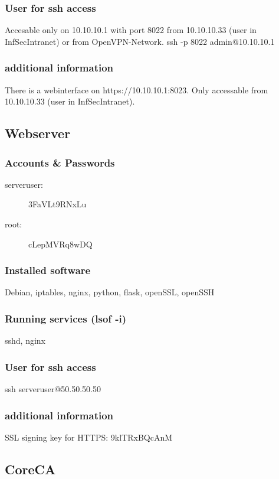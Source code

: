 \documentclass[a4paper,11pt]{article}
\begin{document}
\subsubsection*{User for ssh access}
Accesable only on 10.10.10.1 with port 8022 from 10.10.10.33 (user in InfSecIntranet) or from OpenVPN-Network.\newline
ssh -p 8022 admin@10.10.10.1
\subsubsection*{additional information}
There is a webinterface on https://10.10.10.1:8023. Only accessable from 10.10.10.33 (user in InfSecIntranet).

\subsection{Webserver}
\subsubsection*{Accounts \& Passwords}
\begin{multicols}{2}
\begin{description}
\item[serveruser:] 3FaVLt9RNxLu
\item[root:] cLepMVRq8wDQ
\end{description}
\end{multicols}
\subsubsection*{Installed software}
Debian, iptables, nginx, python, flask, openSSL, openSSH
\subsubsection*{Running services (lsof -i)}
sshd, nginx
\subsubsection*{User for ssh access}
ssh serveruser@50.50.50.50
\subsubsection*{additional information}
SSL signing key for HTTPS: 9klTRxBQcAnM

\subsection{CoreCA}
\end{document}
